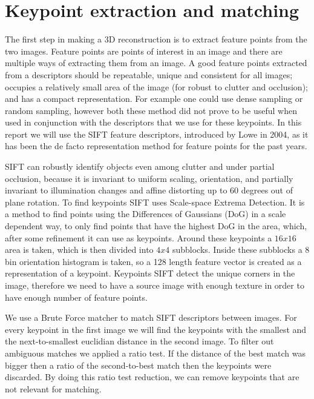 \section{Keypoint extraction and matching}
\label{matching}
The first step in making a 3D reconstruction is to extract feature points from the two images.
Feature points are points of interest in an image and there are multiple ways of extracting them from an image.
A good feature points extracted from a descriptors should be repeatable, unique and consistent for all images;
occupies a relatively small area of the image (for robust to clutter and occlusion); and has a compact representation.
For example one could use dense sampling \cite{DSIFT} or random sampling,
however both these method did not prove to be useful when used in conjunction with the descriptors that we use for these keypoints.
In this report we will use the SIFT feature descriptors, introduced by Lowe\cite{SIFT} in 2004, as it has been the de facto representation method for feature points for the past years.

SIFT can robustly identify objects even among clutter and under partial occlusion, because it is invariant to uniform scaling, orientation, and partially invariant to illumination changes and affine distorting up to 60 degrees out of plane rotation.
To find keypoints SIFT uses Scale-space Extrema Detection.
It is a method to find points using the Differences of Gaussians (DoG) in a scale dependent way, to only find points that have the highest DoG in the area, which, after some refinement it can use as keypoints.
Around these keypoints a $16x16$ area is taken, which is then divided into $4x4$ subblocks.
Inside these subblocks a 8 bin orientation histogram is taken, so a 128 length feature vector is created as a representation of a keypoint.
Keypoints SIFT detect the unique corners in the image, therefore we need to have a source image with enough texture in order to have enough number of feature points.

We use a Brute Force matcher to match SIFT descriptors between images. 
For every keypoint in the first image we will find the keypoints with the smallest and the next-to-smallest euclidian distance in the second image. 
To filter out ambiguous matches we applied a ratio test. 
If the distance of the best match was bigger then a ratio of the second-to-best match then the keypoints were discarded.
By doing this ratio test reduction, we can remove keypoints that are not relevant for matching.


